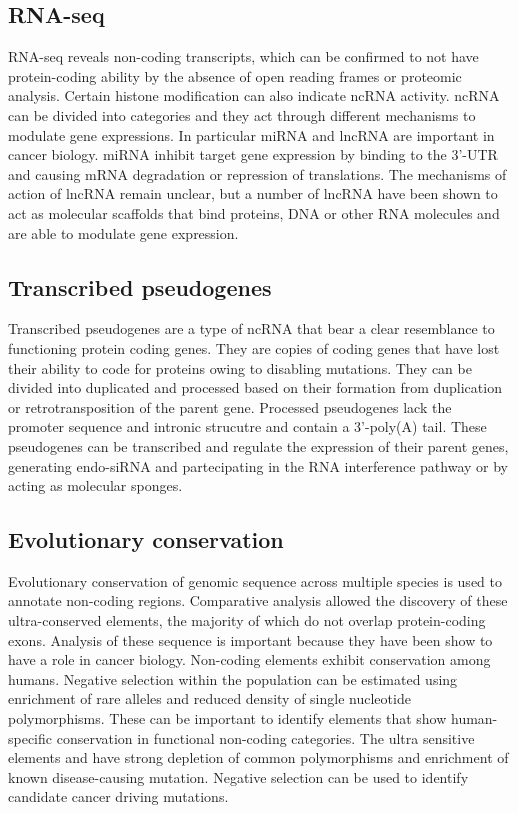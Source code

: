 	\subsection{RNA-seq}
	RNA-seq reveals non-coding transcripts, which can be confirmed to not have protein-coding ability by the absence of open reading frames or proteomic analysis.
	Certain histone modification can also indicate ncRNA activity.
	ncRNA can be divided into categories and they act through different mechanisms to modulate gene expressions.
	In particular miRNA and lncRNA are important in cancer biology.
	miRNA inhibit target gene expression by binding to the 3'-UTR and causing mRNA degradation or repression of translations.
	The mechanisms of action of lncRNA remain unclear, but a number of lncRNA have been shown to act as molecular scaffolds that bind proteins, DNA or other RNA molecules and are able to modulate gene expression.

	\subsection{Transcribed pseudogenes}
	Transcribed pseudogenes are a type of ncRNA that bear a clear resemblance to functioning protein coding genes.
	They are copies of coding genes that have lost their ability to code for proteins owing to disabling mutations.
	They can be divided into duplicated and processed based on their formation from duplication or retrotransposition of the parent gene.
	Processed pseudogenes lack the promoter sequence and intronic strucutre and contain a 3'-poly(A) tail.
	These pseudogenes can be transcribed and regulate the expression of their parent genes, generating endo-siRNA and partecipating in the RNA interference pathway or by acting as molecular sponges.

	\subsection{Evolutionary conservation}
	Evolutionary conservation of genomic sequence across multiple species is used to annotate non-coding regions.
	Comparative analysis allowed the discovery of these ultra-conserved elements, the majority of which do not overlap protein-coding exons.
	Analysis of these sequence is important because they have been show to have a role in cancer biology.
	Non-coding elements exhibit conservation among humans.
	Negative selection within the population can be estimated using enrichment of rare alleles and reduced density of single nucleotide polymorphisms.
	These can be important to identify elements that show human-specific conservation in functional non-coding categories.
	The ultra sensitive elements and have strong depletion of common polymorphisms and enrichment of known disease-causing mutation.
	Negative selection can be used to identify candidate cancer driving mutations.


